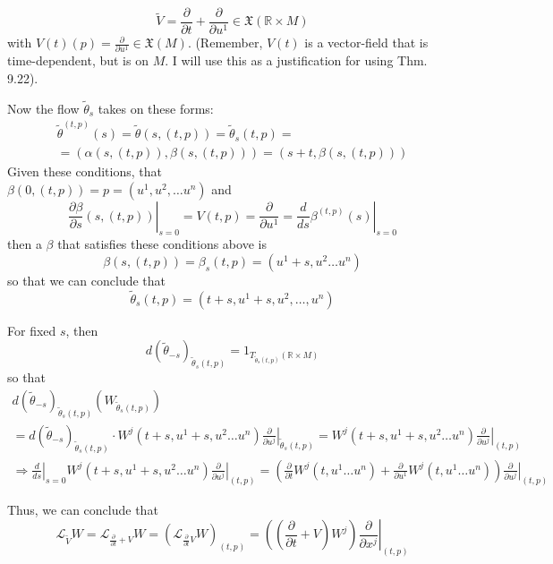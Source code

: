 \[
\widetilde{V} = \frac{ \partial }{ \partial t} + \frac{ \partial }{ \partial u^1} \in \mathfrak{X}(\mathbb{R} \times M)
\]
with $V(t)(p) = \frac{ \partial }{ \partial u^1} \in \mathfrak{X}(M)$.  (Remember, $V(t)$ is a vector-field that is time-dependent, but is on $M$.  I will use this as a justification for using Thm. 9.22).  

Now the flow $\widetilde{\theta}_s$ takes on these forms:
\[
\begin{gathered}
  \widetilde{\theta}^{(t,p)}(s) = \widetilde{\theta}(s,(t,p)) = \widetilde{\theta}_s(t,p) = \\
  = (\alpha(s,(t,p)) , \beta(s,(t,p))) = (s+t, \beta(s,(t,p)) )
\end{gathered}
\]
Given these conditions, that \\
$\beta(0,(t,p)) = p = (u^1,u^2, \dots u^n)$ and 
\[
\left. \frac{ \partial \beta}{ \partial s}(s, (t,p)) \right|_{s=0} = V(t,p) = \frac{ \partial }{ \partial u^1} = \left. \frac{d}{ds} \beta^{(t,p)}(s) \right|_{s=0}
\]
then a $\beta$ that satisfies these conditions above is 
\[
\beta(s,(t,p)) = \beta_s(t,p) = (u^1 + s, u^2 \dots u^n)
\]
so that we can conclude that 
\[
\widetilde{\theta}_s(t,p) = (t+s, u^1 + s, u^2 , \dots , u^n)
\]

For fixed $s$, then
\[
d(\widetilde{\theta}_{-s})_{\widetilde{\theta}_s(t,p)} =1_{T_{\widetilde{\theta}_s(t,p)}(\mathbb{R}\times M)}
\]
so that 
\[
\begin{gathered}
  d(\widetilde{\theta}_{-s})_{\widetilde{\theta}_s(t,p)}(W_{\widetilde{\theta}_s(t,p)}) \\
  = d(\widetilde{\theta}_{-s})_{\widetilde{\theta}_s(t,p)} \cdot W^j(t+s,u^1 +s, u^2 \dots u^n) \left. \frac{ \partial }{ \partial u^j} \right|_{\widetilde{\theta}_s(t,p)} = W^j(t+s,u^1+s, u^2 \dots u^n) \left. \frac{ \partial }{ \partial u^j} \right|_{(t,p)} \\
\Longrightarrow \left. \frac{d}{ds} \right|_{s=0} W^j(t+s,u^1+s, u^2 \dots u^n) \left. \frac{ \partial }{ \partial u^j} \right|_{(t,p)} = \left( \frac{\partial }{ \partial t} W^j(t,u^1 \dots u^n) + \frac{ \partial }{ \partial u^1 } W^j(t,u^1 \dots u^n) \right) \left. \frac{ \partial}{ \partial u^j} \right|_{(t,p)}
\end{gathered}
\]


Thus, we can conclude that 
\begin{equation}
  \boxed{ \mathcal{L}_{\widetilde{V}}W = \mathcal{L}_{ \frac{ \partial }{ \partial t} +V}W = \left( \mathcal{L}_{ \frac{ \partial}{ \partial t} V } W \right)_{(t,p)} = \left( \left( \frac{ \partial }{ \partial t} + V \right) W^j \right) \left. \frac{ \partial }{ \partial x^j} \right|_{(t,p)} }
\end{equation}

